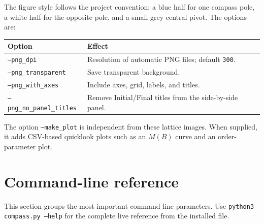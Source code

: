 \documentclass[11pt,a4paper]{article}
\newcommand{\code}[1]{\texttt{#1}}
\begin{document}
The figure style follows the project convention: a blue half for one compass pole, a white half for the opposite pole, and a small grey central pivot. The options are:

\begin{center}
\begin{tabular}{ll}
\toprule
Option & Effect \\
\midrule
\code{--png\_dpi} & Resolution of automatic PNG files; default \code{300}. \\
\code{--png\_transparent} & Save transparent background. \\
\code{--png\_with\_axes} & Include axes, grid, labels, and titles. \\
\code{--png\_no\_panel\_titles} & Remove Initial/Final titles from the side-by-side panel. \\
\bottomrule
\end{tabular}
\end{center}

The option \code{--make\_plot} is independent from these lattice images. When supplied, it adds CSV-based quicklook plots such as an $M(B)$ curve and an order-parameter plot.

\section{Command-line reference}
\label{sec:cli}

This section groups the most important command-line parameters. Use \code{python3 compass.py --help} for the complete live reference from the installed file.
\end{document}
